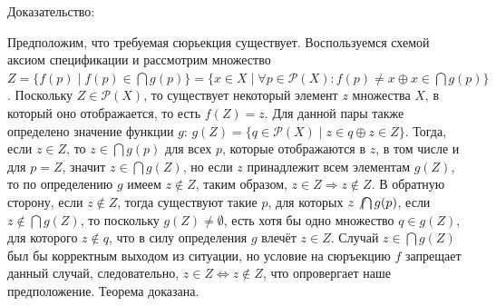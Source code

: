 \documentclass[12pt]{article}
\begin{document}
Доказательство: 

Предположим, что требуемая сюрьекция существует. Воспользуемся схемой аксиом спецификации и рассмотрим множество $Z = \{ f(p) \mid f(p) \in \bigcap g(p) \} = \{ x \in X \mid \forall p \in \mathcal{P}(X) : f(p) \neq x \oplus x \in \bigcap g(p) \}$. Поскольку $Z \in \mathcal{P}(X)$, то существует некоторый элемент $z$ множества $X$, в который оно отображается, то есть $f(Z) = z$. Для данной пары также определено значение функции $g$: $g(Z) = \{ q \in \mathcal{P}(X) \mid z \in q \oplus z \in Z \}$. Тогда, если $z \in Z$, то $z \in \bigcap g(p)$ для всех $p$, которые отображаются в $z$, в том числе и для $p = Z$, значит $z \in \bigcap g(Z)$, но если $z$ принадлежит всем элементам $g(Z)$, то по определению $g$ имеем $z \notin Z$, таким образом, $z \in Z \Rightarrow z \notin Z$. В обратную сторону, если $z \notin Z$, тогда существуют такие $p$, для которых $z \not \bigcap g(p)$, если $z \notin \bigcap g(Z)$, то поскольку $g(Z) \neq \emptyset$, есть хотя бы одно множество $q \in g(Z)$, для которого $z \notin q$, что в силу определения $g$ влечёт $z \in Z$. Случай $z \in \bigcap g(Z)$ был бы корректным выходом из ситуации, но условие на сюръекцию $f$ запрещает данный случай, следовательно, $z \in Z \Leftrightarrow z \notin Z$, что опровергает наше предположение. Теорема доказана.
\end{document}
